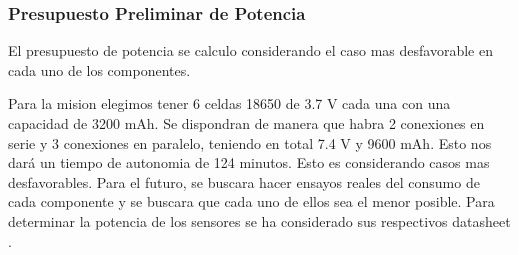     \subsubsection{Presupuesto Preliminar de Potencia}
      El presupuesto de potencia se calculo considerando el caso mas desfavorable en cada uno
      de los componentes.

      \begin{table}[H]
      \centering
      \caption{Consumo de corriente y potencia de los componentes en el caso más desfavorable.}
      \label{tab:consumo_componentes}
      \end{table}

      Para la mision elegimos tener 6 celdas 18650 de 3.7 V cada una con una capacidad de 3200 mAh. Se dispondran de
      manera que habra 2 conexiones en serie y 3 conexiones en paralelo, teniendo en total 7.4 V y 9600 mAh. Esto nos
      dará un tiempo de autonomia de 124 minutos. Esto es considerando casos mas desfavorables. Para el futuro, se
      buscara hacer ensayos reales del consumo de cada componente y se buscara que cada uno de ellos sea el menor posible.
      Para determinar la potencia de los sensores se ha considerado sus respectivos datasheet \cite{datasheet-mpu9250} \cite{datasheet-bpm280}.

